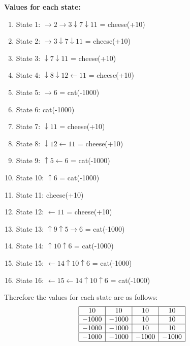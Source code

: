 \documentclass{article}
\begin{document}
\begin{enumerate}[label=(\alph*)]
    \textbf{Values for each state:}
    \begin{enumerate}
        \item State 1: $\rightarrow 2 \rightarrow 3 \downarrow 7 \downarrow 11$ = cheese(+10)
        \item State 2: $\rightarrow 3 \downarrow 7 \downarrow 11$ = cheese(+10)
        \item State 3: $\downarrow 7 \downarrow 11$ = cheese(+10)
        \item State 4: $\downarrow 8 \downarrow 12 \leftarrow 11$ = cheese(+10)
        \item State 5: $\rightarrow 6$ = cat(-1000)
        \item State 6: cat(-1000)
        \item State 7: $\downarrow 11$ = cheese(+10)
        \item State 8: $\downarrow 12 \leftarrow 11$ = cheese(+10)
        \item State 9: $\uparrow 5 \leftarrow 6$ = cat(-1000)
        \item State 10: $\uparrow 6$ = cat(-1000)
        \item State 11: cheese(+10)
        \item State 12: $\leftarrow 11$ = cheese(+10)
        \item State 13: $\uparrow 9 \uparrow 5 \rightarrow 6$ = cat(-1000)
        \item State 14: $\uparrow 10 \uparrow 6$ = cat(-1000)
        \item State 15: $\leftarrow 14 \uparrow 10 \uparrow 6 $ = cat(-1000)
        \item State 16: $\leftarrow 15 \leftarrow 14 \uparrow 10 \uparrow 6$ = cat(-1000)
    \end{enumerate}

    Therefore the values for each state are as follows:
    \[
    \begin{array}{|c|c|c|c|}
    \hline
    10 & 10 & 10 & 10 \\ \hline
    -1000 & -1000 & 10 & 10 \\ \hline
    -1000 & -1000 & 10 & 10 \\ \hline
    -1000 & -1000 & -1000 & -1000 \\ \hline
    \end{array}
    \]



\end{enumerate}
\end{document}
